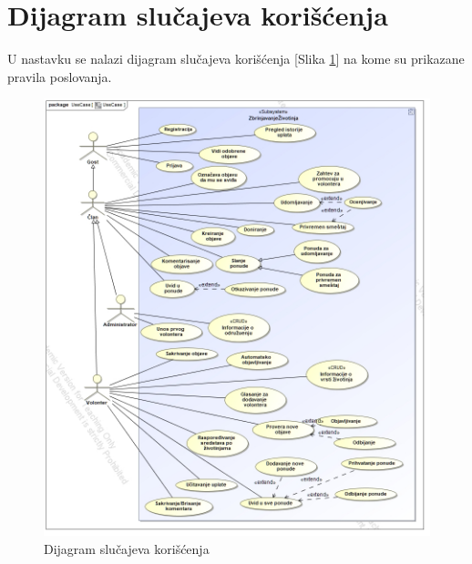 \section{Dijagram slučajeva korišćenja}
U nastavku se nalazi dijagram slučajeva korišćenja [Slika \ref{fig:use-case}] na kome su prikazane pravila poslovanja.
\begin{figure}[h]
    \centering
    \includegraphics[width=\textwidth]{img/use-case.jpg}
    \caption{Dijagram slučajeva korišćenja}
    \label{fig:use-case}
\end{figure}

